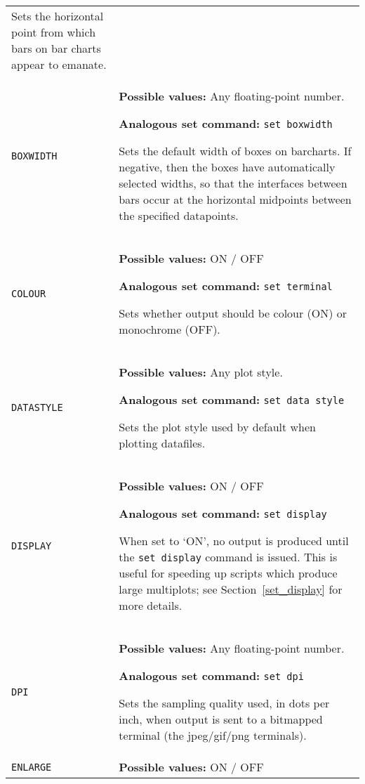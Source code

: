 \documentclass[a4paper,onecolumn,11pt]{book}
\begin{document}
\begin{longtable}{p{3.4cm}p{9cm}}
                   Sets the horizontal point from which bars on bar charts appear to emanate.
                   \\
\texttt{BOXWIDTH} & \textbf{Possible values:} Any floating-point number.

                   \textbf{Analogous set command:} \texttt{set boxwidth}\index{set boxwidth command@\texttt{set boxwidth} command}

                   Sets the default width of boxes on barcharts. If negative, then the boxes have automatically selected widths, so that the interfaces between bars occur at the horizontal midpoints between the specified datapoints.
                   \\
\texttt{COLOUR} & \textbf{Possible values:} ON / OFF

                   \textbf{Analogous set command:} \texttt{set terminal}\index{set terminal command@\texttt{set terminal} command}

                   Sets whether output should be colour (ON) or monochrome (OFF).
                   \\
\texttt{DATASTYLE} & \textbf{Possible values:} Any plot style. 

                   \textbf{Analogous set command:} \texttt{set data style}\index{set data style command@\texttt{set data style} command}
                   
                   Sets the plot style used by default when plotting datafiles.
                   \\
\texttt{DISPLAY} & \textbf{Possible values:} ON / OFF

                   \textbf{Analogous set command:} \texttt{set display}\index{set display command@\texttt{set display} command}

                   When set to `ON', no output is produced until the \texttt{set display} command is issued. This is useful for speeding up scripts which produce large multiplots; see Section~\ref{set_display} for more details.
                   \\
\texttt{DPI} & \textbf{Possible values:} Any floating-point number.

                   \textbf{Analogous set command:} \texttt{set dpi}\index{set dpi command@\texttt{set dpi} command}

                   Sets the sampling quality used, in dots per inch, when output is sent to a bitmapped terminal (the jpeg/gif/png terminals).
                   \\
\texttt{ENLARGE} & \textbf{Possible values:} ON / OFF


\end{longtable}
\end{document}
